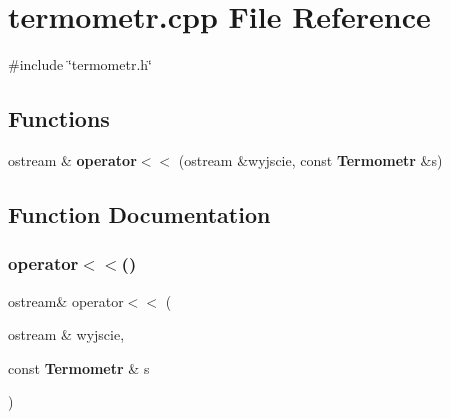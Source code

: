 \section{termometr.\+cpp File Reference}
\label{termometr_8cpp}
{\ttfamily \#include \char`\"{}termometr.\+h\char`\"{}}\newline
\subsection*{Functions}
\begin{DoxyCompactItemize}
\item 
ostream \& \textbf{ operator$<$$<$} (ostream \&wyjscie, const \textbf{ Termometr} \&s)
\end{DoxyCompactItemize}


\subsection{Function Documentation}
\mbox{\label{termometr_8cpp_aa076a790576f7719b5dba864120a1b44}} 
\subsubsection{operator$<$$<$()}
{\footnotesize\ttfamily ostream\& operator$<$$<$ (\begin{DoxyParamCaption}\item[{ostream \&}]{wyjscie,  }\item[{const \textbf{ Termometr} \&}]{s }\end{DoxyParamCaption})}

